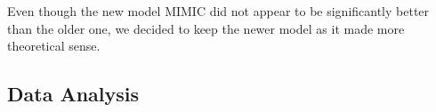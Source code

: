 \documentclass[../main.tex]{subfiles}
\begin{document}
	Even though the new model MIMIC did not appear to be significantly better than the older one, we decided to keep the newer model as it made more theoretical sense.
	
	
	
	\subsection{Data Analysis}
	
\end{document}
